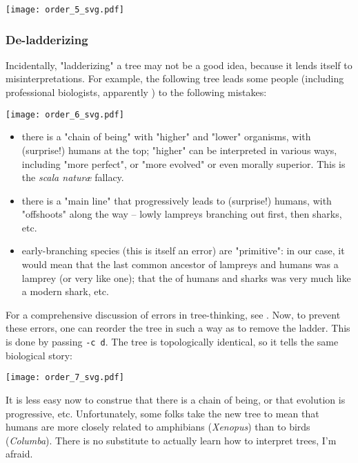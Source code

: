 
\begin{center}
\texttt{[image: order\_5\_svg.pdf]}
\end{center}

\subsubsection{De-ladderizing}

Incidentally, "ladderizing" a tree may not be a good idea, because it lends
itself to misinterpretations. For example, the following tree leads some people
(including professional biologists, apparently \cite{Baum_2005}) to the
following mistakes:

\begin{center}
\texttt{[image: order\_6\_svg.pdf]}
\end{center}
\begin{itemize}
	\item there is a "chain of being" with "higher" and "lower" organisms, with (surprise!) humans at the top; "higher" can be interpreted in various ways, including "more perfect", or "more evolved" or even morally superior. This is the \textit{scala natur\ae} fallacy.
	\item there is a "main line" that progressively leads to (surprise!) humans,
	with "offshoots" along the way -- lowly lampreys branching out first, then sharks, etc. 
	\item early-branching species (this is itself an error) are "primitive": in
	our case, it would mean that the last common ancestor of lampreys and humans
	was a lamprey (or very like one); that the \lca{} of humans and sharks was
	very much like a modern shark, etc.
\end{itemize}
For a comprehensive discussion of errors in tree-thinking, see
\cite{Gregory_2008}.  Now, to prevent these errors, one can reorder the tree in
such a way as to remove the ladder. This is done by passing \texttt{-c d}. The
tree is topologically identical, so it tells the same biological story:


\begin{center}
\texttt{[image: order\_7\_svg.pdf]}
\end{center}

\noindent{}It is less easy now to construe that there is a chain of being, or
that evolution is progressive, etc. Unfortunately, some folks take the new tree
to mean that humans are more closely related to amphibians (\textit{Xenopus})
than to birds (\textit{Columba}). There is no substitute to actually learn how
to interpret trees, I'm afraid. 
